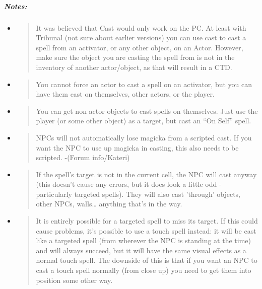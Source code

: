 \documentclass[
]{article}
\begin{document}
\hypertarget{notes}{%
\subparagraph{Notes:}\label{notes}}

\begin{itemize}
\item
  \begin{quote}
  It was believed that Cast would only work on the PC. At least with
  Tribunal (not sure about earlier versions) you can use cast to cast a
  spell from an activator, or any other object, on an Actor. However,
  make sure the object you are casting the spell from is not in the
  inventory of another actor/object, as that will result in a CTD.
  \end{quote}
\item
  \begin{quote}
  You cannot force an actor to cast a spell on an activator, but you can
  have them cast on themselves, other actors, or the player.
  \end{quote}
\item
  \begin{quote}
  You can get non actor objects to cast spells on themselves. Just use
  the player (or some other object) as a target, but cast an ``On Self''
  spell.
  \end{quote}
\item
  \begin{quote}
  NPCs will not automatically lose magicka from a scripted cast. If you
  want the NPC to use up magicka in casting, this also needs to be
  scripted. -(Forum info/Kateri)
  \end{quote}
\item
  \begin{quote}
  If the spell's target is not in the current cell, the NPC will cast
  anyway (this doesn't cause any errors, but it does look a little odd -
  particularly targeted spells). They will also cast 'through' objects,
  other NPCs, walls\ldots{} anything that's in the way.
  \end{quote}
\item
  \begin{quote}
  It is entirely possible for a targeted spell to miss its target. If
  this could cause problems, it's possible to use a touch spell instead:
  it will be cast like a targeted spell (from wherever the NPC is
  standing at the time) and will always succeed, but it will have the
  same visual effects as a normal touch spell. The downside of this is
  that if you want an NPC to cast a touch spell normally (from close up)
  you need to get them into position some other way.
  \end{quote}
\end{itemize}
\end{document}
